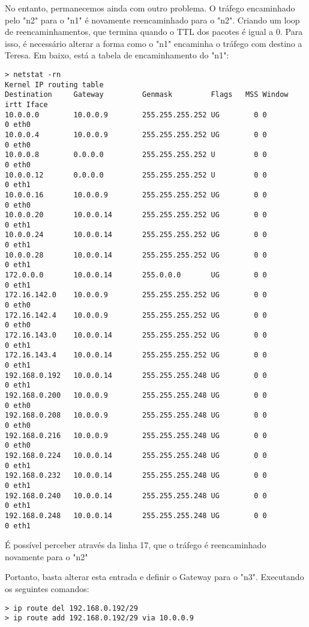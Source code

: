 \documentclass{article}
\begin{document}
No entanto, permanecemos ainda com outro problema. O tráfego encaminhado pelo "n2" para o "n1" é novamente reencaminhado para o "n2". Criando um loop de reencaminhamentos, que termina quando o TTL dos pacotes é igual a 0. Para isso, é necessário alterar a forma como o "n1" encaminha o tráfego com destino a Teresa. 
Em baixo, está a tabela de encaminhamento do "n1": 
\begin{lstlisting}
> netstat -rn
Kernel IP routing table
Destination     Gateway         Genmask         Flags   MSS Window  irtt Iface
10.0.0.0        10.0.0.9        255.255.255.252 UG        0 0          0 eth0
10.0.0.4        10.0.0.9        255.255.255.252 UG        0 0          0 eth0
10.0.0.8        0.0.0.0         255.255.255.252 U         0 0          0 eth0
10.0.0.12       0.0.0.0         255.255.255.252 U         0 0          0 eth1
10.0.0.16       10.0.0.9        255.255.255.252 UG        0 0          0 eth0
10.0.0.20       10.0.0.14       255.255.255.252 UG        0 0          0 eth1
10.0.0.24       10.0.0.14       255.255.255.252 UG        0 0          0 eth1
10.0.0.28       10.0.0.14       255.255.255.252 UG        0 0          0 eth1
172.0.0.0       10.0.0.14       255.0.0.0       UG        0 0          0 eth1
172.16.142.0    10.0.0.9        255.255.255.252 UG        0 0          0 eth0
172.16.142.4    10.0.0.9        255.255.255.252 UG        0 0          0 eth0
172.16.143.0    10.0.0.14       255.255.255.252 UG        0 0          0 eth1
172.16.143.4    10.0.0.14       255.255.255.252 UG        0 0          0 eth1
192.168.0.192   10.0.0.14       255.255.255.248 UG        0 0          0 eth1
192.168.0.200   10.0.0.9        255.255.255.248 UG        0 0          0 eth0
192.168.0.208   10.0.0.9        255.255.255.248 UG        0 0          0 eth0
192.168.0.216   10.0.0.9        255.255.255.248 UG        0 0          0 eth0
192.168.0.224   10.0.0.14       255.255.255.248 UG        0 0          0 eth1
192.168.0.232   10.0.0.14       255.255.255.248 UG        0 0          0 eth1
192.168.0.240   10.0.0.14       255.255.255.248 UG        0 0          0 eth1
192.168.0.248   10.0.0.14       255.255.255.248 UG        0 0          0 eth1
\end{lstlisting}
É possível perceber através da linha 17, que o tráfego é reencaminhado novamente para o "n2"

Portanto, basta alterar esta entrada e definir o Gateway para o "n3". Executando os seguintes comandos: 
\begin{lstlisting}
> ip route del 192.168.0.192/29
> ip route add 192.168.0.192/29 via 10.0.0.9
\end{lstlisting}
\end{document}
